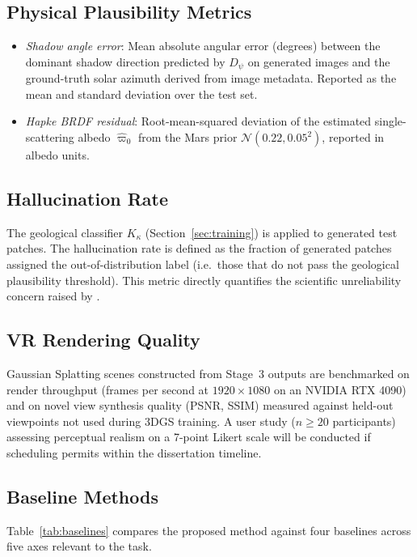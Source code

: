 \documentclass[10pt,journal]{IEEEtran}
\begin{document}
\subsection{Physical Plausibility Metrics}
\begin{itemize}
  \item \textit{Shadow angle error}: Mean absolute angular error (degrees)
    between the dominant shadow direction predicted by $D_\psi$ on generated
    images and the ground-truth solar azimuth derived from image metadata.
    Reported as the mean and standard deviation over the test set.
  \item \textit{Hapke BRDF residual}: Root-mean-squared deviation of the
    estimated single-scattering albedo $\hat{\varpi}_0$ from the Mars
    prior $\mathcal{N}(0.22, 0.05^2)$, reported in albedo units.
\end{itemize}

\subsection{Hallucination Rate}
The geological classifier $K_\kappa$ (Section~\ref{sec:training}) is applied to
generated test patches. The hallucination rate is defined as the fraction of
generated patches assigned the out-of-distribution label (i.e.\ those that do
not pass the geological plausibility threshold). This metric directly quantifies
the scientific unreliability concern raised by
\cite{rathkopf2025reliability,aithal2024hallucination}.

\subsection{VR Rendering Quality}
Gaussian Splatting scenes constructed from Stage~3 outputs are benchmarked on
render throughput (frames per second at $1920 \times 1080$ on an NVIDIA RTX 4090)
and on novel view synthesis quality (PSNR, SSIM) measured against held-out
viewpoints not used during 3DGS training. A user study ($n \geq 20$ participants)
assessing perceptual realism on a 7-point Likert scale will be conducted if
scheduling permits within the dissertation timeline.

\subsection{Baseline Methods}
\label{sec:baselines}

Table~\ref{tab:baselines} compares the proposed method against four baselines
across five axes relevant to the task.
\end{document}

